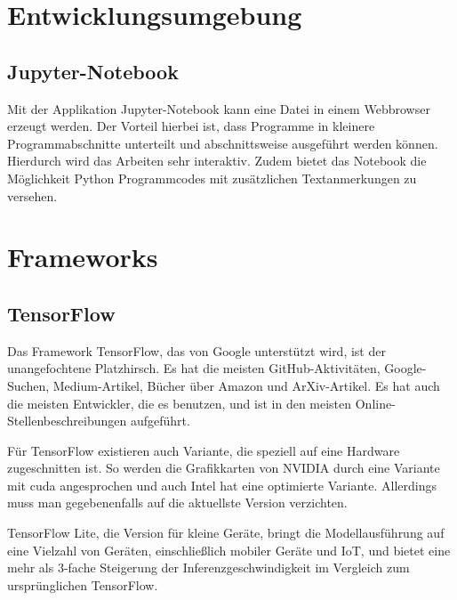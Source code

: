 \section{Entwicklungsumgebung}


\subsection{Jupyter-Notebook}

Mit der Applikation Jupyter-Notebook kann eine Datei in einem Webbrowser erzeugt werden. Der Vorteil hierbei ist, dass Programme in kleinere Programmabschnitte unterteilt und abschnittsweise ausgeführt werden können. Hierdurch wird das Arbeiten sehr interaktiv. Zudem bietet das Notebook die Möglichkeit Python Programmcodes mit zusätzlichen Textanmerkungen zu
versehen. \cite{Buxmann:2019}




\section{Frameworks}







\subsection{TensorFlow}


Das Framework TensorFlow, das von Google unterstützt wird, ist der unangefochtene Platzhirsch. Es hat die meisten GitHub-Aktivitäten, Google-Suchen, Medium-Artikel, Bücher über Amazon und ArXiv-Artikel. Es hat auch die meisten Entwickler, die es benutzen, und ist in den meisten Online-Stellenbeschreibungen aufgeführt. \cite{GoogleTensorFlow:2019}

Für TensorFlow existieren auch Variante, die speziell auf eine Hardware zugeschnitten ist. So werden die Grafikkarten von NVIDIA durch eine Variante mit \ac{cuda} angesprochen und auch Intel hat eine optimierte Variante. Allerdings muss man gegebenenfalls auf die aktuellste Version verzichten.

TensorFlow Lite, die Version für kleine Geräte, bringt die Modellausführung auf eine Vielzahl von Geräten, einschließlich mobiler Geräte und IoT, und bietet eine mehr als 3-fache Steigerung der Inferenzgeschwindigkeit im Vergleich zum ursprünglichen TensorFlow. 

